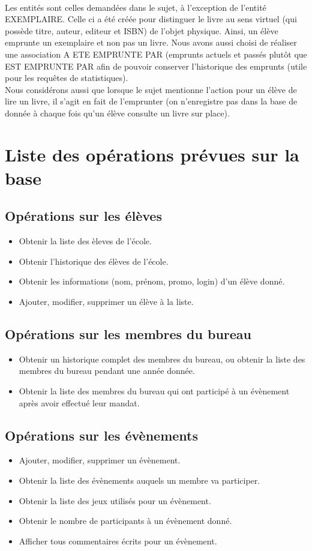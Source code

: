 \documentclass[a4paper, 11pt]{article}
\begin{document}
\paragraph{}
Les entités sont celles demandées dans le sujet, à l'exception de l'entité EXEMPLAIRE. Celle ci a été créée pour distinguer le livre au sens virtuel (qui possède titre, auteur, editeur et ISBN) de l'objet physique. Ainsi, un élève emprunte un exemplaire et non pas un livre. Nous avons aussi choisi de réaliser une association A ETE EMPRUNTE PAR (emprunts actuels et passés plut\^ot que EST EMPRUNTE PAR afin de pouvoir conserver l'historique des emprunts (utile pour les requ\^etes de statistiques).\\
Nous considérons aussi que lorsque le sujet mentionne l'action pour un élève de lire un livre, il s'agit en fait de l'emprunter (on n'enregistre pas dans la base de donnée à chaque fois qu'un élève consulte un livre sur place). 
\section{Liste des opérations prévues sur la base}

\subsection{Opérations sur les élèves}
\begin{itemize}
\item Obtenir la liste des èleves de l'école.
\item Obtenir l'historique des élèves de l'école.
\item Obtenir les informations (nom, prénom, promo, login) d'un élève donné.
\item Ajouter, modifier, supprimer un élève à la liste.
\end{itemize}
\subsection{Opérations sur les membres du bureau}
\begin{itemize}
\item Obtenir un historique complet des membres du bureau, ou obtenir la liste des membres du bureau pendant une année donnée.
\item Obtenir la liste des membres du bureau qui ont participé à un évènement après avoir effectué leur mandat.
\end{itemize}
\subsection{Opérations sur les évènements}
\begin{itemize}
\item Ajouter, modifier, supprimer un évènement.
\item Obtenir la liste des évènements auquels un membre va participer.
\item Obtenir la liste des jeux utilisés pour un évènement.
\item Obtenir le nombre de participants à un évènement donné.
\item Afficher tous commentaires écrits pour un évènement.
\end{itemize}
\end{document}
